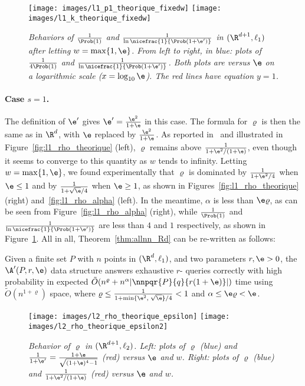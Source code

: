 \begin{figure}[!htb]
\centering
\texttt{[image: images/l1\_p1\_theorique\_fixedw]}
\texttt{[image: images/l1\_k\_theorique\_fixedw]}
\caption{\em Behaviors of $\frac{1}{\Prob(1)}$ and
  $\frac{1}{\ln\nicefrac{1}{\Prob(1+\e')}}$ in $(\R^{d+1}, \ell_1)$ after
  letting $w=\max\{1,\e\}$. From left to right, in blue: plots of
  $\frac{1}{4\Prob(1)}$ and $\frac{1}{\ln\nicefrac{1}{\Prob(1+\e')}}$. Both
  plots are versus $\e$ on a logarithmic scale ($x=\log_{10} \e$). The
  red lines have equation $y=1$.}
\label{fig:l1_p2_k}
\end{figure}

\paragraph{Case $s=1$.}
The definition of $\e'$ gives $\e'=\frac{\e^2}{1+\e}$ in this
case. The formula for $\varrho$ is then the same as in $\R^d$, with
$\e$ replaced by $\frac{\e^2}{1+\e}$. As reported in~\cite{DIIM04} and
illustrated in Figure~\ref{fig:l1_rho_theorique} (left), $\varrho$
remains above $\frac{1}{1+\e^2/(1+\e)}$, even though it seems to
converge to this quantity as $w$ tends to infinity. Letting
$w=\max\{1,\e\}$, we found experimentally that $\varrho$ is dominated
by $\frac{1}{1+\e^2/4}$ when $\e\leq 1$ and by
$\frac{1}{1+\sqrt{\e}/4}$ when $\e\geq 1$, as shown in
Figures~\ref{fig:l1_rho_theorique} (right) and~\ref{fig:l1_rho_alpha}
(left). In the meantime, $\alpha$ is less than $\e\varrho$, as
can be seen from Figure~\ref{fig:l1_rho_alpha} (right), while
$\frac{1}{\Prob(1)}$ and $\frac{1}{\ln\nicefrac{1}{\Prob(1+\e')}}$ are less
than $4$ and $1$ respectively, as shown in Figure~\ref{fig:l1_p2_k}.
All in all, Theorem~\ref{thm:allnn_Rd} can be re-written as follows:
\addtocounter{thm}{-1}
\begin{thm}[case $s=1$] \label{thm:allnn_Rd_l1}
  Given a finite set $P$ with $n$ points in $(\R^d, \ell_1)$, and two
  parameters $r,\e> 0$, the $\A'(P, r, \e)$ data
    structure answers exhaustive $r$-\pleb
  queries correctly with high probability in expected $\tilde
  O(n^\varrho+ n^\alpha|\nnpqr{P}{q}{r(1+\e)}|)$ time using
    $\tilde O(n^{1+\varrho})$ space, where $\varrho\leq
    \frac{1}{1+\min\{\e^2,\;\sqrt{\e}\}/4}<1$ and $\alpha\leq
    \e\varrho < \e$.
\end{thm}


\begin{figure}[!htb]
\centering
\texttt{[image: images/l2\_rho\_theorique\_epsilon]}
\texttt{[image: images/l2\_rho\_theorique\_epsilon2]}
\caption{\em Behavior of $\varrho$ in $(\R^{d+1}, \ell_2)$. Left: plots
  of $\varrho$ (blue) and
  $\frac{1}{1+\e'}=\frac{1+\e}{\sqrt{(1+\e)^4-1}}$ (red) versus $\e$
  and $w$.  Right: plots of $\varrho$ (blue) and
  $\frac{1}{1+\e^2/(1+\e)}$ (red) versus $\e$ and $w$.}
\label{fig:l2_rho_theorique}
\end{figure}

